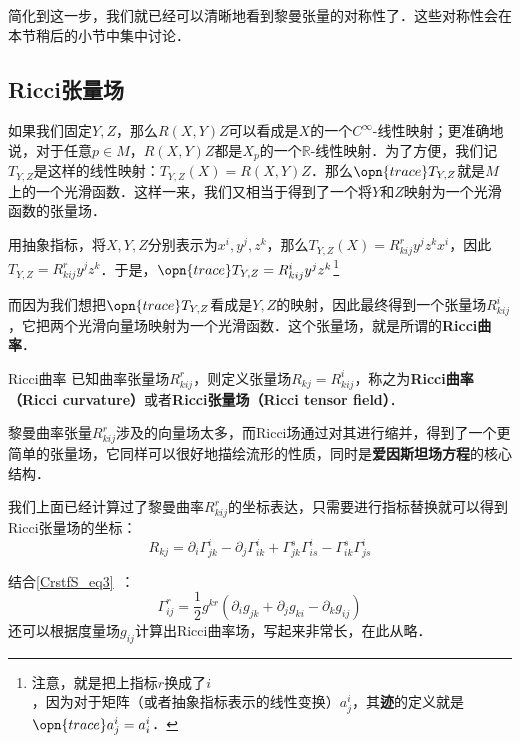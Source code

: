 简化到这一步，我们就已经可以清晰地看到黎曼张量的对称性了．这些对称性会在本节稍后的小节中集中讨论．











\subsection{Ricci张量场}

如果我们固定$Y, Z$，那么$R(X, Y)Z$可以看成是$X$的一个$C^{\infty}$-线性映射；更准确地说，对于任意$p\in M$，$R(X, Y)Z$都是$X_p$的一个$\mathbb{R}$-线性映射．为了方便，我们记$T_{Y, Z}$是这样的线性映射：$T_{Y, Z}(X)=R(X, Y)Z$．那么$\opn{trace}T_{Y, Z}$就是$M$上的一个光滑函数．这样一来，我们又相当于得到了一个将$Y$和$Z$映射为一个光滑函数的张量场．

用抽象指标，将$X, Y, Z$分别表示为$x^i, y^j, z^k$，那么$T_{Y, Z}(X)=R^r_{kij}y^jz^kx^i$，因此$T_{Y, Z}=R^r_{kij}y^jz^k$．于是，$\opn{trace}T_{Y, Z}=R^i_{kij}y^jz^k$\footnote{注意，就是把上指标$r$换成了$i$，因为对于矩阵（或者抽象指标表示的线性变换）$a^i_j$，其\textbf{迹}的定义就是$\opn{trace}a^i_j=a^i_i$．}

而因为我们想把$\opn{trace}T_{Y, Z}$看成是$Y, Z$的映射，因此最终得到一个张量场$R^i_{kij}$，它把两个光滑向量场映射为一个光滑函数．这个张量场，就是所谓的\textbf{Ricci曲率}．

\begin{definition}{Ricci曲率}
已知曲率张量场$R^r_{kij}$，则定义张量场$R_{kj}=R^i_{kij}$，称之为\textbf{Ricci曲率（Ricci curvature）}或者\textbf{Ricci张量场（Ricci tensor field）}．
\end{definition}

黎曼曲率张量$R^r_{kij}$涉及的向量场太多，而Ricci场通过对其进行缩并，得到了一个更简单的张量场，它同样可以很好地描绘流形的性质，同时是\textbf{爱因斯坦场方程}的核心结构．

我们上面已经计算过了黎曼曲率$R^r_{kij}$的坐标表达，只需要进行指标替换就可以得到Ricci张量场的坐标：
\begin{equation}\label{RicciC_eq9}
R_{kj}=\partial_i\Gamma^i_{jk}-\partial_j\Gamma^{i}_{ik}+\Gamma^s_{jk}\Gamma^i_{is}-\Gamma^s_{ik}\Gamma^i_{js}
\end{equation}

结合\autoref{CrstfS_eq3}~：
\begin{equation}
\Gamma^{r}_{ij}=\frac{1}{2}g^{kr}(\partial_ig_{jk}+\partial_jg_{ki}-\partial_kg_{ij})
\end{equation}
还可以根据度量场$g_{ij}$计算出Ricci曲率场，写起来非常长，在此从略．





